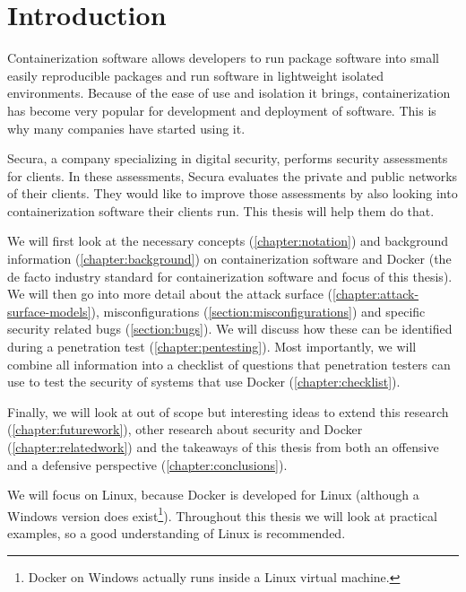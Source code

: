 \chapter{Introduction}
Containerization software allows developers to run package software into small easily reproducible packages and run software in lightweight isolated environments. Because of the ease of use and isolation it brings, containerization has become very popular for development and deployment of software. This is why many companies have started using it.

Secura, a company specializing in digital security, performs security assessments for clients. In these assessments, Secura evaluates the private and public networks of their clients. They would like to improve those assessments by also looking into containerization software their clients run. This thesis will help them do that.

\medskip

We will first look at the necessary concepts (\autoref{chapter:notation}) and background information (\autoref{chapter:background}) on containerization software and Docker (the de facto industry standard for containerization software and focus of this thesis). We will then go into more detail about the attack surface (\autoref{chapter:attack-surface-models}), misconfigurations (\autoref{section:misconfigurations}) and specific security related bugs (\autoref{section:bugs}). We will discuss how these can be identified during a penetration test (\autoref{chapter:pentesting}). Most importantly, we will combine all information into a checklist of questions that penetration testers can use to test the security of systems that use Docker (\autoref{chapter:checklist}).

Finally, we will look at out of scope but interesting ideas to extend this research (\autoref{chapter:futurework}), other research about security and Docker (\autoref{chapter:relatedwork}) and the takeaways of this thesis from both an offensive and a defensive perspective (\autoref{chapter:conclusions}).

\medskip

We will focus on Linux, because Docker is developed for Linux (although a Windows version does exist\footnote{Docker on Windows actually runs inside a Linux virtual machine.}). Throughout this thesis we will look at practical examples, so a good understanding of Linux is recommended.
